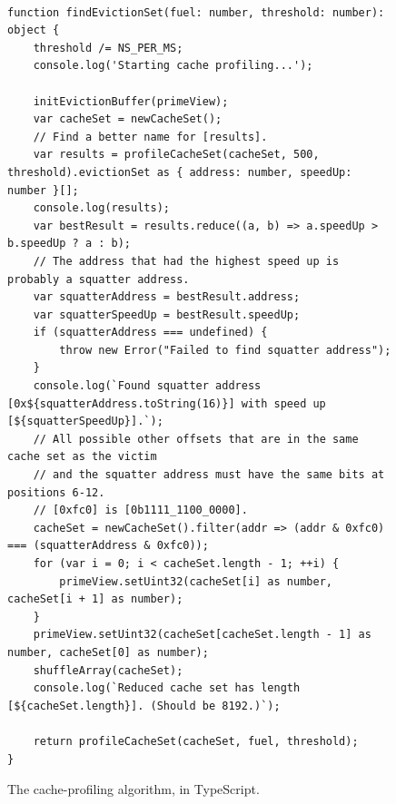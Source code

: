 \documentclass[a4paper,10pt,twocolumn]{article}
\theoremstyle{definition}
\begin{document}
\begin{figure}[h]
  \begin{verbatim}

function findEvictionSet(fuel: number, threshold: number): object {
    threshold /= NS_PER_MS;
    console.log('Starting cache profiling...');

    initEvictionBuffer(primeView);
    var cacheSet = newCacheSet();
    // Find a better name for [results].
    var results = profileCacheSet(cacheSet, 500, threshold).evictionSet as { address: number, speedUp: number }[];
    console.log(results);
    var bestResult = results.reduce((a, b) => a.speedUp > b.speedUp ? a : b);
    // The address that had the highest speed up is probably a squatter address.
    var squatterAddress = bestResult.address;
    var squatterSpeedUp = bestResult.speedUp;
    if (squatterAddress === undefined) {
        throw new Error("Failed to find squatter address");
    }
    console.log(`Found squatter address [0x${squatterAddress.toString(16)}] with speed up [${squatterSpeedUp}].`);
    // All possible other offsets that are in the same cache set as the victim
    // and the squatter address must have the same bits at positions 6-12.
    // [0xfc0] is [0b1111_1100_0000].
    cacheSet = newCacheSet().filter(addr => (addr & 0xfc0) === (squatterAddress & 0xfc0));
    for (var i = 0; i < cacheSet.length - 1; ++i) {
        primeView.setUint32(cacheSet[i] as number, cacheSet[i + 1] as number);
    }
    primeView.setUint32(cacheSet[cacheSet.length - 1] as number, cacheSet[0] as number);
    shuffleArray(cacheSet);
    console.log(`Reduced cache set has length [${cacheSet.length}]. (Should be 8192.)`);

    return profileCacheSet(cacheSet, fuel, threshold);
}
\end{verbatim}
  \caption{The cache-profiling algorithm, in TypeScript.}
\end{figure} 
\end{document}
